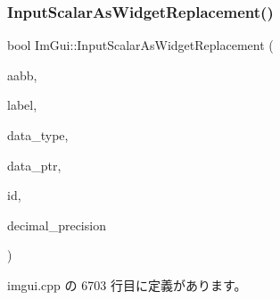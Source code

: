 \subsubsection{\texorpdfstring{Input\+Scalar\+As\+Widget\+Replacement()}{InputScalarAsWidgetReplacement()}}
{\footnotesize\ttfamily bool Im\+Gui\+::\+Input\+Scalar\+As\+Widget\+Replacement (\begin{DoxyParamCaption}\item[{const \mbox{\hyperlink{struct_im_rect}{Im\+Rect}} \&}]{aabb,  }\item[{const char $\ast$}]{label,  }\item[{\mbox{\hyperlink{imgui__internal_8h_a22f27475affc8d8a1f2407887e5e1d19}{Im\+Gui\+Data\+Type}}}]{data\+\_\+type,  }\item[{void $\ast$}]{data\+\_\+ptr,  }\item[{\mbox{\hyperlink{imgui_8h_a1785c9b6f4e16406764a85f32582236f}{Im\+Gui\+ID}}}]{id,  }\item[{int}]{decimal\+\_\+precision }\end{DoxyParamCaption})}



 imgui.\+cpp の 6703 行目に定義があります。

